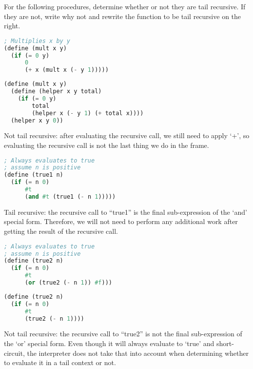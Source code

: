 \question
For the following procedures, determine whether or not they are tail recursive. If they are not, write why not and rewrite the function to be tail recursive on the right.

\begin{lstlisting}[language=Scheme]
; Multiplies x by y
(define (mult x y)
  (if (= 0 y)
      0
      (+ x (mult x (- y 1)))))
\end{lstlisting}

\begin{solution}
\begin{lstlisting}[language=Scheme]
(define (mult x y)
  (define (helper x y total)
    (if (= 0 y)
        total
        (helper x (- y 1) (+ total x))))
  (helper x y 0))
\end{lstlisting}
Not tail recursive: after evaluating the recursive call, we still need to apply `+', so evaluating the recursive call is not the last thing we do in the frame.
\end{solution}

\begin{lstlisting}[language=Scheme]
; Always evaluates to true
; assume n is positive
(define (true1 n)
  (if (= n 0)
      #t
      (and #t (true1 (- n 1)))))
\end{lstlisting}
\begin{solution}
Tail recursive: the recursive call to ``true1'' is the final sub-expression of the `and' special form. Therefore, we will not need to perform any additional work after getting the result of the recursive call.
\end{solution}

\begin{lstlisting}[language=Scheme]
; Always evaluates to true
; assume n is positive
(define (true2 n)
  (if (= n 0)
      #t
      (or (true2 (- n 1)) #f)))
\end{lstlisting}

\begin{solution}
\begin{lstlisting}[language=Scheme]
(define (true2 n)
  (if (= n 0)
      #t
      (true2 (- n 1))))
\end{lstlisting}
Not tail recursive: the recursive call to ``true2'' is not the final sub-expression of the `or' special form. Even though it will always evaluate to `true' and short-circuit, the interpreter does not take that into account when determining whether to evaluate it in a tail context or not.
\end{solution}

